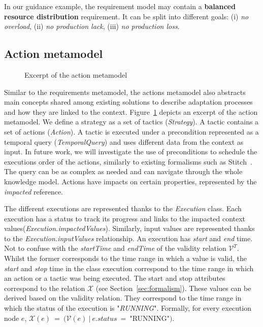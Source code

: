 In our guidance example, the requirement model may contain a \textbf{balanced resource distribution} requirement. It can be split into different goals: (i) \textit{no overload}, (ii) \textit{no production lack}, (iii) \textit{no production loss}.

\subsection{Action metamodel}
\label{sec:action-mm}

\begin{figure}
	\centering
	\caption{Excerpt of the action metamodel}
	\label{fig:action-mm}
\end{figure}

Similar to the requirements metamodel, the actions metamodel also abstracts main concepts shared among existing solutions to describe adaptation processes and how they are linked to the context. Figure~\ref{fig:action-mm} depicts an excerpt of the action metamodel.
We define a strategy as a set of tactics (\textit{Strategy}).
A tactic contains a set of actions (\textit{Action}).
A tactic is executed under a precondition represented as a temporal query (\textit{TemporalQuery}) and uses different data from the context as input. In future work, we will investigate the use of preconditions to schedule the executions order of the actions, similarly to existing formalisms such as Stitch~\cite{DBLP:journals/jss/ChengG12}.
The query can be as complex as needed and can navigate through the whole knowledge model.
Actions have impacts on certain properties, represented by the \textit{impacted} reference. 

The different executions are represented thanks to the \textit{Execution} class. Each execution has a status to track its progress and links to the impacted context values(\textit{Execution.impactedValues}).
Similarly, input values are represented thanks to the \textit{Execution.inputValues} relationship.
An execution has \textit{start} and \textit{end} time. Not to confuse with the \textit{startTime} and \textit{endTime} of the validity relation $\mathcal{V}^T$. Whilst the former corresponds to the time range in which a value is valid, the \textit{start} and \textit{stop} time in the class execution correspond to the time range in which an action or a tactic was being executed. The start and stop attributes correspond to the relation $\mathcal{X}$ (see Section~\ref{sec:formalism}). These values can be derived based on the validity relation. They correspond to the time range in which the status of the execution is "\textit{RUNNING}".  Formally, for every execution node $e$, $\mathcal{X}(e)~=~(\mathcal{V}(e)~|~e.status~=~$"RUNNING"$)$.


